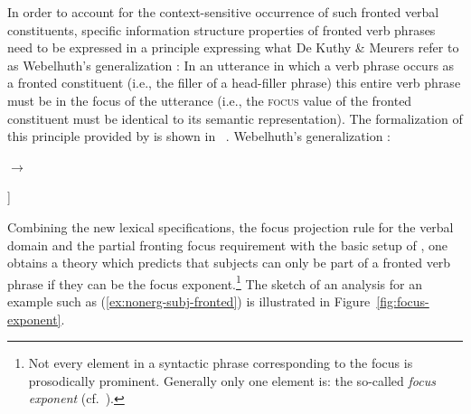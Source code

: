 \documentclass[output=paper]{langsci/langscibook}
\begin{document}
In order to account for the context-sensitive occurrence of such
fronted verbal constituents, specific information structure properties
of fronted verb phrases need to be expressed in a principle expressing
what De Kuthy \& Meurers refer to as Webelhuth's generalization \citep[53]{Webelhuth90-ohne-crossref}: In
an utterance in which a verb phrase occurs as a fronted constituent
(i.e., the filler of a head-filler phrase) this entire verb phrase
must be in the focus of the utterance (i.e., the \textsc{focus} value
of the fronted constituent must be identical to its semantic
representation).  The formalization of this principle provided by \citep{dKM2003a} is shown in~ .
\ea
\bigskip
Webelhuth's generalization \citep{dKM2003a}:\\
\begin{flushleft}
\qquad\begin{avm}
\end{avm}
$\to$\ 
\end{flushleft}
\begin{flushright}
\begin{avm}
  [info-struc|focus <@1>\\
  non-head-dtr  [info-struc|focus & <@1>\\
  synsem|loc|cont|lf & @1]]\qquad
\end{avm}\medskip
\label{fig:webelhuths-generalization}
\end{flushright}\unskip
\z
Combining the new lexical specifications, the focus projection rule
for the verbal domain and the partial fronting focus requirement with
the basic setup of \cite{deKuthy2002a}, one obtains a theory which
predicts that subjects can only be part of a fronted verb phrase
if they can be the focus exponent.\footnote{Not every element in a syntactic phrase corresponding to the focus is prosodically prominent. Generally only one element is: the so-called \textit{focus exponent} (cf.\ \citealt{Selkirk95a-u}).} The sketch of an analysis for an
example such as (\ref{ex:nonerg-subj-fronted}) is illustrated in
Figure~\ref{fig:focus-exponent}.
\end{document}
